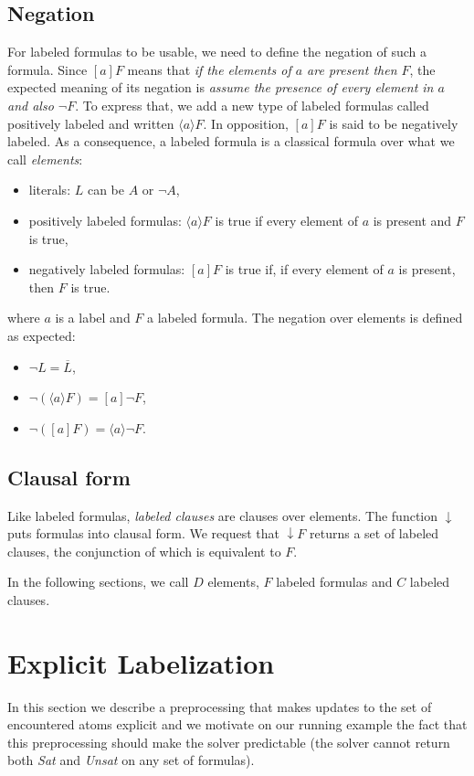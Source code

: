 \documentclass[a4paper,11pt]{article}
\begin{document}
\subsection{Negation}
For labeled formulas to be usable, we need to define the negation of such a formula. Since $[a]F$
means that \emph{if the elements of $a$ are present then $F$}, the expected meaning of its negation is
\emph{assume the presence of every element in $a$ and also $\neg F$}. To express that, we add a new type
of labeled formulas called positively labeled and written $\langle a\rangle F$. In opposition, $[a]F$
is said to be negatively labeled.
As a consequence, a labeled formula is a classical formula over what we call \emph{elements}:
\begin{itemize}
 \item literals: $L$ can be $A$ or $\neg A$,
 \item positively labeled formulas: $\langle a\rangle F$ is true if every element of $a$ is present
and $F$ is true,
 \item negatively labeled formulas: $[a]F$ is true if, if every element of $a$ is present,
then $F$ is true.
\end{itemize}
where $a$ is a label and $F$ a labeled formula.
The negation over elements is defined as expected:
\begin{itemize}
 \item $\neg L=\overline L$,
 \item $\neg(\langle a\rangle F)=[a]\neg F$,
 \item $\neg([a]F)=\langle a\rangle\neg F$.
\end{itemize}
\subsection{Clausal form}
Like labeled formulas, \emph{labeled clauses} are clauses over elements.
The function $\downarrow$ puts formulas into clausal form. We request that $\downarrow F$
returns a set of labeled clauses, the conjunction of which is equivalent to $F$.

In the following sections, we call $D$ elements, $F$ labeled formulas and $C$ labeled clauses.

\section{Explicit Labelization}
In this section we describe a preprocessing that makes updates to the set of encountered atoms
explicit and we motivate on our running example the fact that this preprocessing should make the solver
predictable (the solver cannot return both \emph{Sat} and \emph{Unsat} on any set of formulas).
\end{document}

